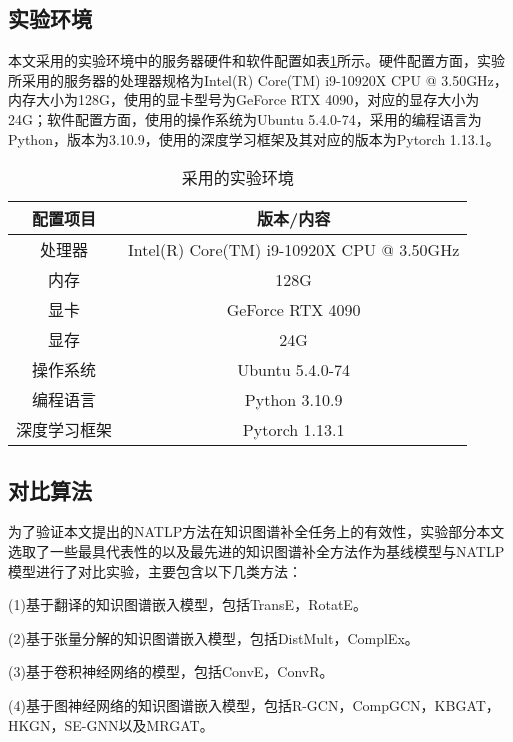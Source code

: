 \subsection{实验环境}

本文采用的实验环境中的服务器硬件和软件配置如表\ref{environment}所示。硬件配置方面，实验所采用的服务器的处理器规格为Intel(R) Core(TM) i9-10920X CPU @ 3.50GHz，内存大小为128G，使用的显卡型号为GeForce RTX 4090，对应的显存大小为24G；软件配置方面，使用的操作系统为Ubuntu 5.4.0-74，采用的编程语言为Python，版本为3.10.9，使用的深度学习框架及其对应的版本为Pytorch 1.13.1。

\begin{table}[htbp]
    \renewcommand\arraystretch{1.5}
    \caption{采用的实验环境}
    \centering
    \begin{tabular}{*{2}{c}}
      \toprule
      配置项目 & 版本/内容\\
      \midrule
      处理器  & Intel(R) Core(TM) i9-10920X CPU @ 3.50GHz \\
      内存 & 128G\\
      显卡 & GeForce RTX 4090\\
      显存 & 24G\\
      操作系统 & Ubuntu 5.4.0-74\\
      编程语言 & Python 3.10.9\\
      深度学习框架 & Pytorch 1.13.1\\
      \bottomrule
    \end{tabular}
    \label{environment}
\end{table}


\subsection{对比算法}

为了验证本文提出的NATLP方法在知识图谱补全任务上的有效性，实验部分本文选取了一些最具代表性的以及最先进的知识图谱补全方法作为基线模型与NATLP模型进行了对比实验，主要包含以下几类方法：

(1)基于翻译的知识图谱嵌入模型，包括TransE，RotatE。

(2)基于张量分解的知识图谱嵌入模型，包括DistMult，ComplEx。
 
(3)基于卷积神经网络的模型，包括ConvE，ConvR。

(4)基于图神经网络的知识图谱嵌入模型，包括R-GCN，CompGCN，KBGAT，HKGN，SE-GNN以及MRGAT。

